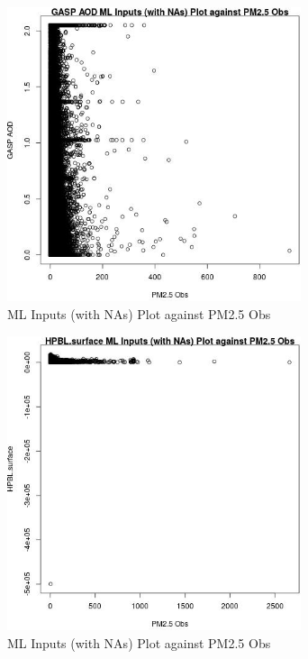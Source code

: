 \begin{figure} 
\centering  
\includegraphics[width=0.77\textwidth]{Code_Outputs/Report_ML_input_PM25_Step4_part_e_de_duplicated_aves_compiled_2019-05-21wNAs_GASP_AODvPM25_Obs.jpg} 
\caption{\label{fig:Report_ML_input_PM25_Step4_part_e_de_duplicated_aves_compiled_2019-05-21wNAsGASP_AODvPM25_Obs}ML Inputs (with NAs) Plot against PM2.5 Obs} 
\end{figure} 
 

\begin{figure} 
\centering  
\includegraphics[width=0.77\textwidth]{Code_Outputs/Report_ML_input_PM25_Step4_part_e_de_duplicated_aves_compiled_2019-05-21wNAs_HPBLsurfacevPM25_Obs.jpg} 
\caption{\label{fig:Report_ML_input_PM25_Step4_part_e_de_duplicated_aves_compiled_2019-05-21wNAsHPBLsurfacevPM25_Obs}ML Inputs (with NAs) Plot against PM2.5 Obs} 
\end{figure} 
 

